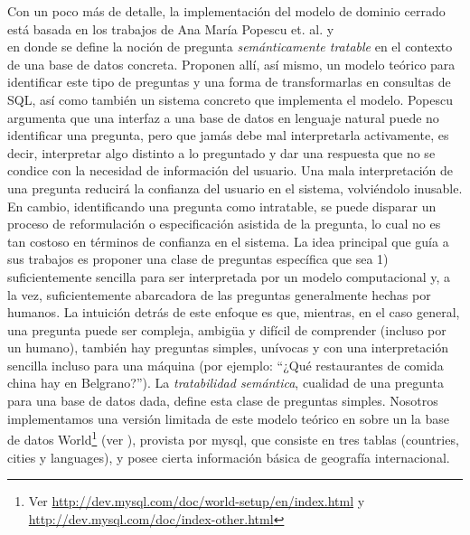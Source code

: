 Con un poco más de detalle, la implementación del modelo de dominio cerrado está basada en los trabajos de Ana María Popescu et. al.  \cite{QADB1} y \\
\cite{QADB2} en donde se define la noción de pregunta \textit{semánticamente tratable} en el contexto de una base de datos concreta. Proponen allí, así mismo, un modelo teórico para identificar este tipo de preguntas y una forma de transformarlas en consultas de SQL, así como también un sistema concreto que implementa el modelo. Popescu argumenta que una interfaz a una base de datos en lenguaje natural puede no identificar una pregunta, pero que jamás debe mal interpretarla activamente, es decir, interpretar algo distinto a lo preguntado y dar una respuesta que no se condice con la necesidad de información del usuario. Una mala interpretación de una pregunta reducirá la confianza del usuario en el sistema, volviéndolo inusable. En cambio, identificando una pregunta como intratable, se puede disparar un proceso de reformulación o especificación asistida de la pregunta, lo cual no es tan costoso en términos de confianza en el sistema. La idea principal que guía a sus trabajos es proponer una clase de preguntas específica que sea 1) suficientemente sencilla para ser interpretada por un modelo computacional y, a la vez, suficientemente abarcadora de las preguntas generalmente hechas por humanos. La intuición detrás de este enfoque es que, mientras, en el caso general, una pregunta puede ser compleja, ambigüa y difícil de comprender (incluso por un humano), también hay preguntas simples, unívocas y con una interpretación sencilla incluso para una máquina (por ejemplo: ``¿Qué restaurantes de comida china hay en Belgrano?''). La \textit{tratabilidad semántica}, cualidad de una pregunta para una base de datos dada, define esta clase de preguntas simples. Nosotros implementamos una versión limitada de este modelo teórico en  sobre un la base de datos World\footnote{Ver \url{http://dev.mysql.com/doc/world-setup/en/index.html} y \url{http://dev.mysql.com/doc/index-other.html}} (ver ), provista por mysql, que consiste en tres tablas (countries, cities y languages), y posee cierta información básica de geografía internacional.


